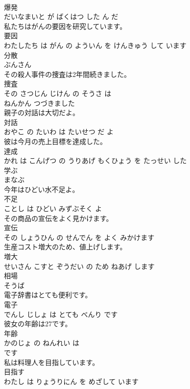 \documentclass[8pt]{extreport}
\begin{document}
\begin{CJK}{UTF8}{min}
\\	爆発 
\\	だいなまいと が ばくはつ した ん だ			
\\	私たちはがんの要因を研究しています。	
\\	要因 
\\	わたしたち は がん の よういん を けんきゅう して います			
\\	分散	
\\	ぶんさん			
\\	その殺人事件の捜査は2年間続きました。	
\\	捜査 
\\	その さつじん じけん の そうさ は 
\\	ねんかん つづきました			
\\	親子の対話は大切だよ。	
\\	対話 
\\	おやこ の たいわ は たいせつ だ よ			
\\	彼は今月の売上目標を達成した。	
\\	達成 
\\	かれ は こんげつ の うりあげ もくひょう を たっせい した			
\\	学ぶ	
\\	まなぶ			
\\	今年はひどい水不足よ。	
\\	不足 
\\	ことし は ひどい みずぶそく よ			
\\	その商品の宣伝をよく見かけます。	
\\	宣伝 
\\	その しょうひん の せんでん を よく みかけます			
\\	生産コスト増大のため、値上げします。	
\\	増大 
\\	せいさん こすと ぞうだい の ため ねあげ します			
\\	相場	
\\	そうば			
\\	電子辞書はとても便利です。	
\\	電子 
\\	でんし じしょ は とても べんり です			
\\	彼女の年齢は27です。	
\\	年齢 
\\	かのじょ の ねんれい は 
\\	です			
\\	私は料理人を目指しています。	
\\	目指す 
\\	わたし は りょうりにん を めざして います			

\end{CJK}
\end{document}
